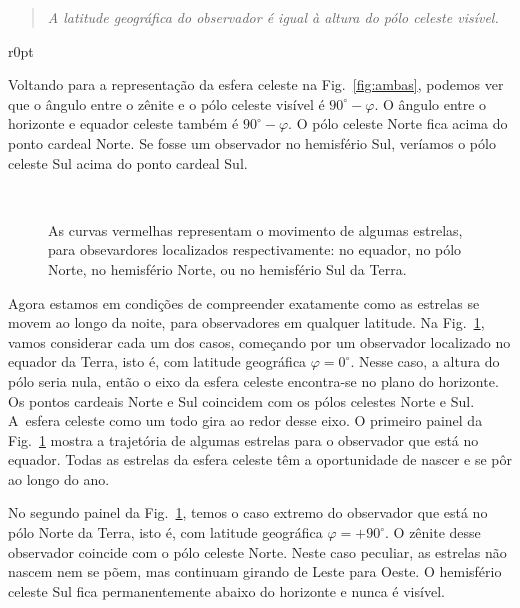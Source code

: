 \begin{quote}
\textit{A latitude geográfica do observador é igual à altura do pólo celeste visível.}
\end{quote}

\begin{wrapfigure}[18]{r}{0pt}

\caption{Esfera celeste mostrando o horizonte e o equador celeste.}
\label{fig:ambas}
\end{wrapfigure}

Voltando para a representação da esfera celeste na Fig.~\ref{fig:ambas}, podemos ver que o ângulo entre o zênite e o pólo celeste visível é $90^{\circ}-\varphi$. O ângulo entre o horizonte e equador celeste também é $90^{\circ}-\varphi$. O pólo celeste Norte fica acima do ponto cardeal Norte. Se fosse um observador no hemisfério Sul, veríamos o pólo celeste Sul acima do ponto cardeal Sul.

\begin{figure}
%
\\
%
 
\caption{As curvas vermelhas representam o movimento de algumas estrelas, para obsevardores localizados respectivamente: no equador, no pólo Norte, no hemisfério Norte, ou no hemisfério Sul da Terra.}
\label{fig:no}
\end{figure}

Agora estamos em condições de compreender exatamente como as estrelas se movem ao longo da noite, para observadores em qualquer latitude. Na Fig.~\ref{fig:no}, vamos considerar cada um dos casos, começando por um observador localizado no equador da Terra, isto é, com latitude geográfica $\varphi=0^{\circ}$. Nesse caso, a altura do pólo seria nula, então o eixo da esfera celeste encontra-se no plano do horizonte. Os pontos cardeais Norte e Sul coincidem com os pólos celestes Norte e Sul. A~esfera celeste como um todo gira ao redor desse eixo. O primeiro painel da Fig.~\ref{fig:no} mostra a trajetória de algumas estrelas para o observador que está no equador. Todas as estrelas da esfera celeste têm a oportunidade de nascer e se pôr ao longo do ano.

No segundo painel da Fig.~\ref{fig:no}, temos o caso extremo do observador que está no pólo Norte da Terra, isto é, com latitude geográfica $\varphi=+90^{\circ}$. O zênite desse observador coincide com o pólo celeste Norte. Neste caso peculiar, as estrelas não nascem nem se põem, mas continuam girando de Leste para Oeste. O hemisfério celeste Sul fica permanentemente abaixo do horizonte e nunca é visível.

